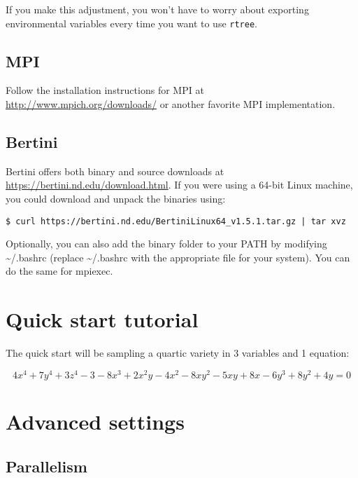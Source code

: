 \documentclass[11pt]{article}
\begin{document}
If you make this adjustment, you won't have to worry about exporting environmental variables every time you want to use \texttt{rtree}.

\subsection{MPI} 
Follow the installation instructions for MPI at \url{http://www.mpich.org/downloads/} or another favorite MPI implementation. 

\subsection{Bertini} 
Bertini offers both binary and source downloads at \url{https://bertini.nd.edu/download.html}. If you were using a 64-bit Linux machine, you could download and unpack the binaries using: 

\begin{verbatim} 
$ curl https://bertini.nd.edu/BertiniLinux64_v1.5.1.tar.gz | tar xvz
\end{verbatim} 

Optionally, you can also add the binary folder to your PATH by modifying \textasciitilde /.bashrc (replace \textasciitilde /.bashrc with the appropriate file for your system). You can do the same for mpiexec. 


\section{Quick start tutorial} 
The quick start will be sampling a quartic variety in 3 variables and 1 equation:

\[
4x^4+7y^4+3z^4-3-8x^3+2x^2y-4x^2-8xy^2-5xy+8x-6y^3+8y^2+4y = 0
\]




\section{Advanced settings}

\subsection{Parallelism}
\end{document}

